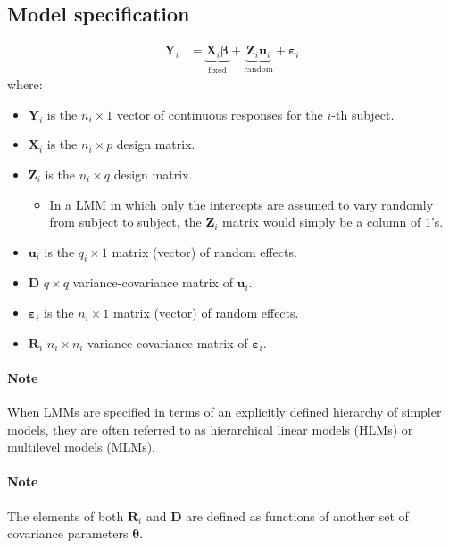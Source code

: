 \documentclass[english]{article}
\begin{document}
\begin{multicols*}{2}
\subsection{Model specification}
\begin{align*}
	\bm{Y}_{i}
	&=	\underbrace{\bm{X}_{i}\bm{\beta}}_{\text{fixed}} + \underbrace{\bm{Z}_{i}\bm{u}_{i}}_{\text{random}} + \bm{\varepsilon}_{i}
\end{align*}
where:
\begin{itemize}
	\item	$\bm{Y}_{i}$ is the $n_{i} \times 1$ vector of continuous responses for the $i$-th subject.
	\item	$\bm{X}_{i}$ is the $n_{i} \times p$ design matrix.
	\item	$\bm{Z}_{i}$ is the $n_{i} \times q$ design matrix.
		\begin{itemize}
		\item	In a LMM in which only the intercepts are assumed to vary randomly from subject to subject, the $\bm{Z}_{i}$ matrix would simply be a column of $1$'s.
		\end{itemize}	
	\item	$\bm{u}_{i}$ is the $q_{i} \times 1$ matrix (vector) of random effects.
	\item	$\bm{D}$ $q \times q$ variance-covariance matrix of $\bm{u}_{i}$.
	\item	$\bm{\varepsilon}_{i}$ is the $n_{i} \times 1$ matrix (vector) of random effects.
	\item	$\bm{R}_{i}$ $n_{i} \times n_{i}$ variance-covariance matrix of $\bm{\varepsilon}_{i}$.
\end{itemize}

\paragraph{Note}	When LMMs are specified in terms of an explicitly defined hierarchy of simpler models, they are often referred to as hierarchical linear models (HLMs) or multilevel models (MLMs). 

\paragraph{Note}	The elements of both $\bm{R}_{i}$ and $\bm{D}$ are defined as functions of another set of covariance parameters $\bm{\theta}$.


\end{multicols*}
\end{document}
